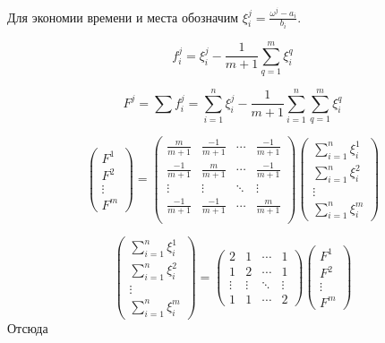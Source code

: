 \documentclass[12pt,a4paper,titlepage,oneside]{book}
\theoremstyle{definition}
\theoremstyle{plain}
\theoremstyle{remark}
\theoremstyle{remark}
\theoremstyle{plain}
\theoremstyle{plain}
\begin{document}
Для экономии времени и места обозначим $\xi_i^j = \frac{\omega^j - a_i}{b_i}$.

\begin{equation*}
f_i^j = \xi_i^j - \frac{1}{m+1} \sum\limits_{q=1}^m \xi_i^q
\end{equation*}

\begin{equation}
F^j = \sum\limits f_i^j = \sum\limits_{i=1}^n \xi_i^j - \frac{1}{m+1} \sum\limits_{i=1}^n \sum\limits_{q=1}^m \xi_i^q
\end{equation}

\begin{equation*}
\begin{pmatrix}
F^1 \\ F^2 \\ \vdots\\ F^m 
\end{pmatrix} 
=
\begin{pmatrix}
\frac{m}{m+1} & \frac{-1}{m+1} & \cdots & \frac{-1}{m+1} \\
\frac{-1}{m+1} & \frac{m}{m+1} & \cdots & \frac{-1}{m+1} \\
\vdots & \vdots & \ddots & \vdots\\
\frac{-1}{m+1} & \frac{-1}{m+1} & \cdots & \frac{m}{m+1} \\
\end{pmatrix}
\begin{pmatrix}
\sum\limits_{i=1}^n \xi_i^1 \\ \sum\limits_{i=1}^n \xi_i^2 \\ \vdots \\ \sum\limits_{i=1}^n \xi_i^m
\end{pmatrix}
\end{equation*}

\begin{equation*}
\begin{pmatrix}
\sum\limits_{i=1}^n \xi_i^1 \\ \sum\limits_{i=1}^n \xi_i^2 \\ \vdots \\ \sum\limits_{i=1}^n \xi_i^m
\end{pmatrix}
=
\begin{pmatrix}
2 & 1 & \cdots & 1\\
1 & 2 & \cdots & 1\\
\vdots & \vdots & \ddots & \vdots\\
1 & 1 & \cdots & 2 
\end{pmatrix}
\begin{pmatrix}
F^1 \\ F^2 \\ \vdots\\ F^m 
\end{pmatrix}
\end{equation*}
Отсюда
\end{document}
